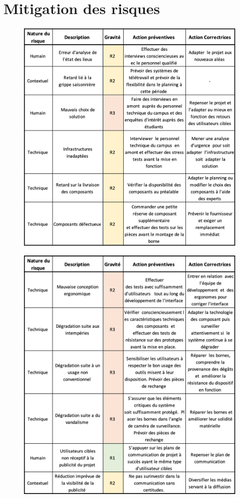 \section{Mitigation des risques}

    \begin{figure}
        \centering
        \includegraphics[width=15cm]{Pictures/mitigation1.png}
    \end{figure}

    \begin{figure}
        \centering
        \includegraphics[width=15cm]{Pictures/mitigation2.png}
    \end{figure}
